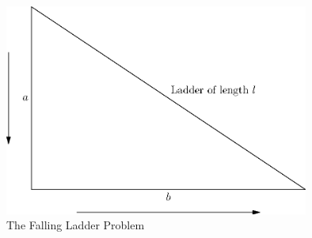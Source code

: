 \documentclass[fleqn]{report}
\begin{document}
\begin{figure}[ht]
\centering
\includegraphics[width=10cm]{figure07.eps}
\caption{The Falling Ladder Problem}
\label{figure-falling-ladder}
\end{figure}
\end{document}
